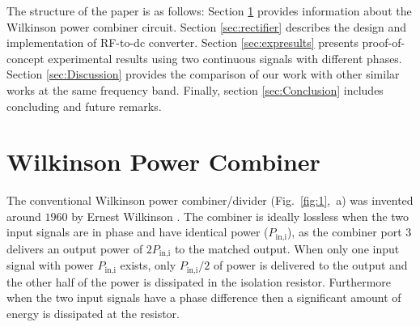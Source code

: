 \documentclass[journal]{IEEEtran}
\begin{document}
The structure of the paper is as follows: Section \ref{sec:Wilkinson} provides information about the  Wilkinson power combiner circuit. 
%
Section \ref{sec:rectifier} describes the design and implementation of RF-to-dc converter.
%
Section \ref{sec:expresults} presents proof-of-concept experimental
results using two continuous signals with different phases.
%
 Section \ref{sec:Discussion} provides
the comparison of our work with other similar works at the same frequency band.
%
Finally, section \ref{sec:Conclusion} includes concluding and future remarks.

 

\section{Wilkinson Power Combiner}
\label{sec:Wilkinson}

The   conventional  Wilkinson power  combiner/divider (Fig.~\ref{fig:1},~a) was invented around $1960$ by  Ernest Wilkinson \cite{wilkinson1960n}. 
%
%
%
%
%
%
% 
The combiner is ideally lossless when the two input signals are in phase and have identical power ($P_\text{in,i}$), as the combiner port $3$ delivers an output power of $2P_\text{in,i}$ to the matched output.
%
When only one input signal with power $P_\text{in,i}$ exists, only  $P_\text{in,i}/{2}$ of power is delivered to the output and the other half of the power is dissipated in the isolation resistor.
%
Furthermore when the two input signals have a phase difference then a significant amount of energy is dissipated at the resistor. 
\end{document}

